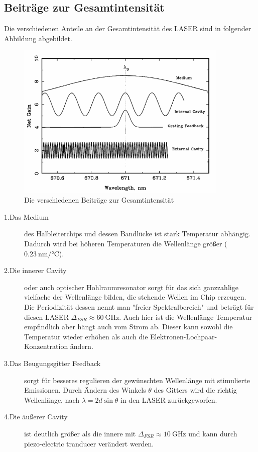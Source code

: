 \newpage
\subsection{Beiträge zur Gesamtintensität}
Die verschiedenen Anteile an der Gesamtintensität des LASER sind in folgender Abbildung abgebildet. 

\begin{figure}[H]
    \centering
    \includegraphics[width=0.9\textwidth]{Bilder/LASER_Moden.png} 
    \caption{Die verschiedenen Beiträge zur Gesamtintensität \cite{man:v60}}
    \label{fig:Moden}
\end{figure}

\begin{description}
    \item[1.Das Medium] des Halbleiterchips und dessen Bandlücke ist stark Temperatur abhängig. 
    Dadurch wird bei höheren Temperaturen die Wellenlänge größer ($\qty{0.23}{\nano\meter\per\celsius}$). 
    \item[2.Die innerer Cavity] oder auch optischer Hohlraumresonator sorgt für das sich ganzzahlige vielfache der Wellenlänge bilden, die stehende Wellen im Chip erzeugen. 
    Die Periodizität dessen nennt man "freier Spektralbereich" und beträgt für diesen LASER $\Delta_{FSR} \approx  \qty{60}{\giga\hertz}$. 
    Auch hier ist die Wellenlänge Temperatur empfindlich aber hängt auch vom Strom ab. 
    Dieser kann sowohl die Temperatur wieder erhöhen als auch die Elektronen-Lochpaar-Konzentration ändern. 
    \item[3.Das Beugungsgitter Feedback] sorgt für besseres regulieren der gewünschten Wellenlänge mit stimulierte Emissionen. 
    Durch Ändern des Winkels $\theta $ des Gitters wird die richtig Wellenlänge, nach $\lambda =2d \sin\theta $ in den LASER zurückgeworfen. 
    \item[4.Die äußerer Cavity] ist deutlich größer als die innere mit $\Delta_{FSR} \approx  \qty{10}{\giga\hertz}$ und kann durch piezo-electric tranducer verändert werden. 
\end{description}

